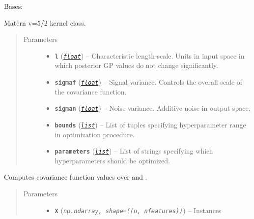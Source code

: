 \documentclass[letterpaper,10pt,english]{sphinxmanual}
\begin{document}

\begin{fulllineitems}
\label{pyGPGO.covfunc:pyGPGO.covfunc.matern52}
Bases: \href{https://docs.python.org/2/library/functions.html\#object}{}

Matern v=5/2 kernel class.
\begin{quote}\begin{description}
\item[{Parameters}] \leavevmode\begin{itemize}
\item {} 
\textbf{\texttt{l}} (\href{https://docs.python.org/2/library/functions.html\#float}{\emph{\texttt{float}}}) -- Characteristic length-scale. Units in input space in which posterior GP values do not
change significantly.

\item {} 
\textbf{\texttt{sigmaf}} (\href{https://docs.python.org/2/library/functions.html\#float}{\emph{\texttt{float}}}) -- Signal variance. Controls the overall scale of the covariance function.

\item {} 
\textbf{\texttt{sigman}} (\href{https://docs.python.org/2/library/functions.html\#float}{\emph{\texttt{float}}}) -- Noise variance. Additive noise in output space.

\item {} 
\textbf{\texttt{bounds}} (\href{https://docs.python.org/2/library/functions.html\#list}{\emph{\texttt{list}}}) -- List of tuples specifying hyperparameter range in optimization procedure.

\item {} 
\textbf{\texttt{parameters}} (\href{https://docs.python.org/2/library/functions.html\#list}{\emph{\texttt{list}}}) -- List of strings specifying which hyperparameters should be optimized.

\end{itemize}

\end{description}\end{quote}

\begin{fulllineitems}
\label{pyGPGO.covfunc:pyGPGO.covfunc.matern52.K}
Computes covariance function values over  and .
\begin{quote}\begin{description}
\item[{Parameters}] \leavevmode\begin{itemize}
\item {} 
\textbf{\texttt{X}} (\emph{\texttt{np.ndarray, shape=((n, nfeatures))}}) -- Instances


\end{itemize}
\end{description}
\end{quote}
\end{fulllineitems}
\end{fulllineitems}
\end{document}
